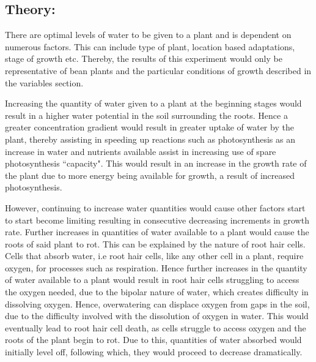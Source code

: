 \documentclass[11pt, a4]{article}
\begin{document}
		\subsection{Theory:}
			There are optimal levels of water to be given to a plant and is dependent on numerous factors. This can include type of plant, location based adaptations, stage of growth etc. Thereby, the results of this experiment would only be representative of bean plants and the particular conditions of growth described in the variables section.
			
			Increasing the quantity of water given to a plant at the beginning stages would result in a higher water potential in the soil surrounding the roots. Hence a greater concentration gradient would result in greater uptake of water by the plant, thereby assisting in speeding up reactions such as photosynthesis as an increase in water and nutrients available assist in increasing use of spare photosynthesis ``capacity". This would result in an increase in the growth rate of the plant due to more energy being available for growth, a result of increased photosynthesis. 
			
			However, continuing to increase water quantities would cause other factors start to start become limiting resulting in consecutive decreasing increments in growth rate. Further increases in quantities of water available to a plant would cause the roots of said plant to rot. This can be explained by the nature of root hair cells. Cells that absorb water, i.e root hair cells, like any other cell in a plant, require oxygen, for processes such as respiration. Hence further increases in the quantity of water available to a plant would result in root hair cells struggling to access the oxygen needed, due to the bipolar nature of water, which creates difficulty in dissolving oxygen. Hence, overwatering can displace oxygen from gaps in the soil, due to the difficulty involved with the dissolution of oxygen in water. This would eventually lead to root hair cell death, as cells struggle to access oxygen and the roots of the plant begin to rot. Due to this, quantities of water absorbed would initially level off, following which, they would proceed to decrease dramatically. 
			
\end{document}
